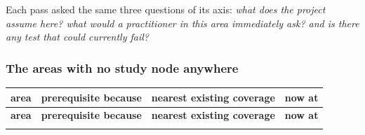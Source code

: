 Each pass asked the same three questions of its axis: \emph{what does the
project assume here? what would a practitioner in this area immediately ask? and
is there any test that could currently fail?}

\subsubsection{The areas with no study node anywhere}
\label{sec:noareas}

\begingroup
\footnotesize
\begin{longtable}{@{}L{2.9cm} L{4.6cm} L{4.0cm} L{2.6cm}@{}}
\toprule
\textbf{area} & \textbf{prerequisite because} & \textbf{nearest existing coverage} & \textbf{now at} \\
\midrule
\endfirsthead
\toprule
\textbf{area} & \textbf{prerequisite because} & \textbf{nearest existing coverage} & \textbf{now at} \\
\midrule
\endhead
\bottomrule
\endfoot


\end{longtable}

